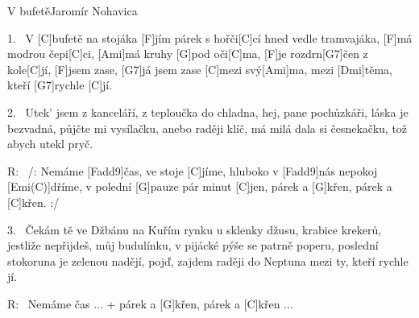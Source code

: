 \begin{song}{V bufetě}{Jaromír Nohavica}

\begin{xverse}{1.~}
V [C]bufetě na stojáka [F]jím párek s hořči[C]cí
hned vedle tramvajáka, [F]má modrou čepi[C]ci,
[Ami]má kruhy [G]pod oči[C]ma, [F]je rozdrn[G7]{čen} z kole[C]jí,
[F]jsem zase, [G7]já jsem zase [C]mezi svý[Ami]ma, mezi [Dmi]těma, kteří [G7]rychle [C]jí.
\end{xverse}

\begin{xverse}{2.~}
Utek' jsem z kanceláří, z teploučka do chladna,
hej, pane pochůzkáři, láska je bezvadná,
půjčte mi vysílačku, anebo raději klíč,
má milá dala si česnekačku, tož abych utekl pryč.
\end{xverse}

\begin{xverse}{R:~}
/: Nemáme [Fadd9]{čas}, ve stoje [C]jíme,
hluboko v [Fadd9]{nás} nepokoj [Emi(C)]dříme,
v polední [G]pauze pár minut [C]jen,
párek a [G]křen, párek a [C]křen. :/
\end{xverse}

\begin{xverse}{3.~}
Čekám tě ve Džbánu na Kuřím rynku
u sklenky džusu, krabice krekerů,
jestliže nepřijdeš, můj budulínku,
v pijácké pýše se patrně poperu,
poslední stokoruna je zelenou nadějí,
pojď, zajdem raději do Neptuna mezi ty, kteří rychle jí.
\end{xverse}

\begin{xverse}{R:~}
Nemáme čas ...
+ párek a [G]křen, párek a [C]křen ...
\end{xverse}

\end{song}



